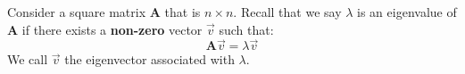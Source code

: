 

Consider a square matrix $\mathbf{A}$ that is $n \times n$. Recall that we say $\lambda$ is an eigenvalue of $\mathbf{A}$ if there exists a \textbf{non-zero} vector $\vec{v}$ such that:
$$\mathbf{A}\vec{v} = \lambda\vec{v}$$
We call $\vec{v}$ the eigenvector associated with $\lambda$.


